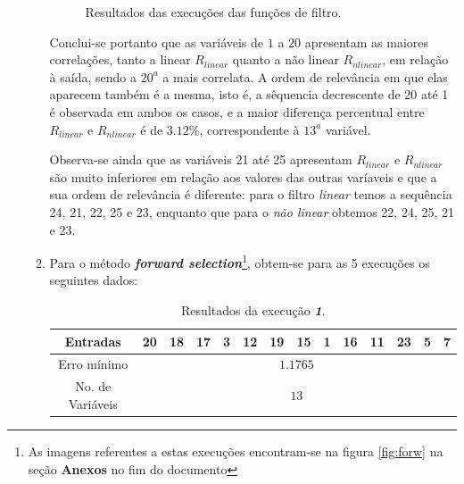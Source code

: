 \begin{enumerate}
\begin{enumerate}
\begin{figure}
				\caption{Resultados das execuções das funções de filtro.}
				\end{figure}
				
				
			\FloatBarrier
				
			Conclui-se portanto que as variáveis de \(1\) a \(20\) apresentam as maiores
			correlações, tanto a linear \(R_{linear}\) quanto a não linear \(R_{nlinear}\),
			em relação à saída, sendo a \(20^a\) a mais correlata. A ordem de relevância em
			que elas aparecem também é a mesma, isto é, a sêquencia decrescente de 20 até 1
			é observada em ambos os casos, e a maior diferença percentual entre
			\(R_{linear}\) e \(R_{nlinear}\) é de \(3.12\%\), correspondente à \(13^a\)
			variável.
				
				\vspace{12pt}
				
			Observa-se ainda que as variáveis 21 até 25 apresentam \(R_{linear}\) e
			\(R_{nlinear}\) são muito inferiores em relação aos valores das outras varíaveis
			e que a sua ordem de relevância é diferente: para o filtro \textit{linear} temos
			a sequência 24, 21, 22, 25 e 23, enquanto que para o \textit{não linear} obtemos
			22, 24, 25, 21 e 23.
			
			
			\item Para o método \textbf{\textit{forward selection}}\footnote{As
			imagens referentes a estas execuções encontram-se na figura \ref{fig:forw}
			na seção \textbf{Anexos} no fim do documento}, obtem-se para as 5 execuções os seguintes dados:
			
			\begin{table}[H]
				    \centering
				    \footnotesize
					\caption{\label{tab:forward1_sunspot} Resultados da execução
					\textit{\textbf{1}}.}
				    \vspace{-6pt}
					\begin{tabular}{|c | c | c | c | c | c | c | c | c | c | c | c | c | c|}
					\hline
					Entradas & 20 & 18 & 17 & 3 & 12 & 19 & 15 & 1 & 16 & 11 & 23 & 5 & 7 \\
					\hline
					Erro mínimo & \multicolumn{13}{c|}{\(1.1765\)}  \\ \hline
					No. de Variáveis & \multicolumn{13}{c|}{\(13\)}  \\
					\hline
					
					\end{tabular}	    
			    \end{table}    

		\vspace{-12pt}


\end{enumerate}
\end{enumerate}
